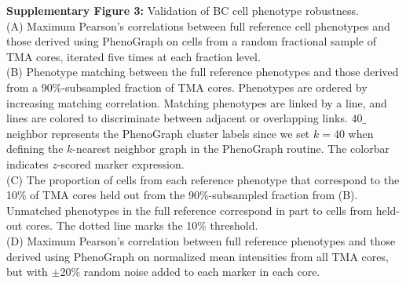 \documentclass[preprint,review,3p,12pt]{elsarticle}
\begin{document}
\newpage

\noindent
\textbf{Supplementary Figure 3:} Validation of BC cell phenotype robustness.\\
(A) Maximum Pearson's correlations between full reference cell phenotypes and those derived using PhenoGraph on cells from a random fractional sample of TMA cores, iterated five times at each fraction level. \\
(B) Phenotype matching between the full reference phenotypes and those derived from a 90$\%$-subsampled fraction of TMA cores. Phenotypes are ordered by increasing matching correlation. Matching phenotypes are linked by a line, and lines are colored to discriminate between adjacent or overlapping links. $40\_$neighbor represents the PhenoGraph cluster labels since we set $k=40$ when defining the $k$-nearest neighbor graph in the PhenoGraph routine. The colorbar indicates $z$-scored marker expression.\\
(C) The proportion of cells from each reference phenotype that correspond to the 10$\%$ of TMA cores held out from the 90$\%$-subsampled fraction from (B). Unmatched phenotypes in the full reference correspond in part to cells from held-out cores. The dotted line marks the 10$\%$ threshold.\\
(D) Maximum Pearson's correlation between full reference phenotypes and those derived using PhenoGraph on normalized mean intensities from all TMA cores, but with $\pm$20$\%$ random noise added to each marker in each core.
\end{document}

